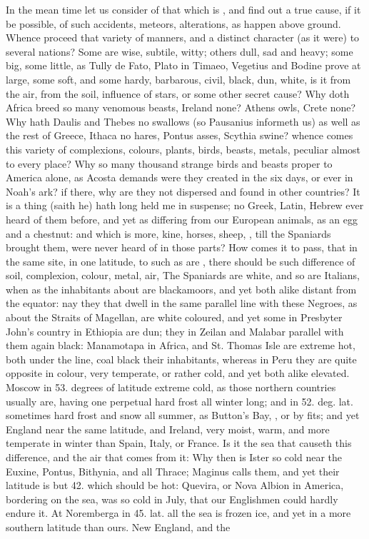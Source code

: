 {In the mean time let us consider of that which is , and find out a true cause, if it be possible, of such accidents, meteors, alterations, as happen above ground. Whence proceed that variety of manners, and a distinct character (as it were) to several nations? Some are wise, subtile, witty; others dull, sad and heavy; some big, some little, as Tully de Fato, Plato in Timaeo, Vegetius and Bodine prove at large,  some soft, and some hardy, barbarous, civil, black, dun, white, is it from the air, from the soil, influence of stars, or some other secret cause? Why doth Africa breed so many venomous beasts, Ireland none? Athens owls, Crete none? Why hath Daulis and Thebes no swallows (so Pausanius informeth us) as well as the rest of Greece, Ithaca no hares, Pontus asses, Scythia swine? whence comes this variety of complexions, colours, plants, birds, beasts, metals, peculiar almost to every place? Why so many thousand strange birds and beasts proper to America alone, as Acosta demands  were they created in the six days, or ever in Noah's ark? if there, why are they not dispersed and found in other countries? It is a thing (saith he) hath long held me in suspense; no Greek, Latin, Hebrew ever heard of them before, and yet as differing from our European animals, as an egg and a chestnut: and which is more, kine, horses, sheep, \etc{}, till the Spaniards brought them, were never heard of in those parts? How comes it to pass, that in the same site, in one latitude, to such as are , there should be such difference of soil, complexion, colour, metal, air, \etc{} The Spaniards are white, and so are Italians, when as the inhabitants about  are blackamoors, and yet both alike distant from the equator: nay they that dwell in the same parallel line with these Negroes, as about the Straits of Magellan, are white coloured, and yet some in Presbyter John's country in Ethiopia are dun; they in Zeilan and Malabar parallel with them again black: Manamotapa in Africa, and St. Thomas Isle are extreme hot, both under the line, coal black their inhabitants, whereas in Peru they are quite opposite in colour, very temperate, or rather cold, and yet both alike elevated. Moscow in 53. degrees of latitude extreme cold, as those northern countries usually are, having one perpetual hard frost all winter long; and in 52. deg. lat. sometimes hard frost and snow all summer, as Button's Bay, \etc{}, or by fits; and yet England near the same latitude, and Ireland, very moist, warm, and more temperate in winter than Spain, Italy, or France. Is it the sea that causeth this difference, and the air that comes from it: Why then is Ister so cold near the Euxine, Pontus, Bithynia, and all Thrace;  Maginus calls them, and yet their latitude is but 42. which should be hot: Quevira, or Nova Albion in America, bordering on the sea, was so cold in July, that our Englishmen could hardly endure it. At Noremberga in 45. lat. all the sea is frozen ice, and yet in a more southern latitude than ours. New England, and the }
